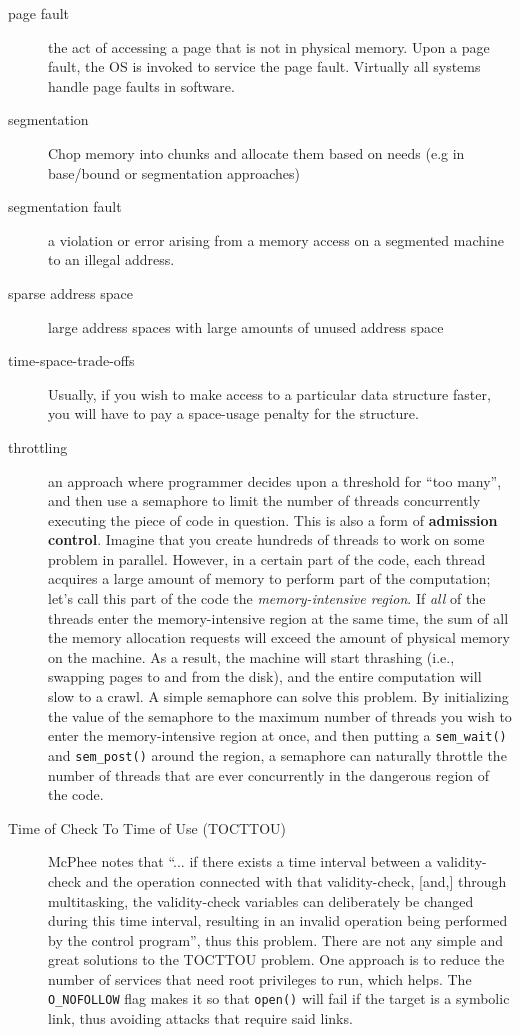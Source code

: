 \begin{description}
\item[page fault] the act of accessing a page that is not in physical memory.  Upon a page fault, the OS is invoked to service the page fault.  Virtually all systems handle page faults in software.

\item[segmentation] Chop memory into  chunks and allocate them based on needs (e.g in base/bound or segmentation approaches)

\item[segmentation fault] a violation or error arising from a memory access on a segmented machine to an illegal address.

\item[sparse address space] large address spaces with large amounts of unused address space

\item[time-space-trade-offs] Usually, if you wish to make access to a particular data structure faster, you will have to pay a space-usage penalty for the structure.

\item[throttling] an approach where programmer decides upon a threshold for ``too many'', and then use a semaphore to limit the number of threads concurrently executing the piece of code in question.  This is also a form of \textbf{admission control}. Imagine that you create hundreds of threads to work on some problem in parallel. However, in a certain part of the code, each thread acquires a large amount of memory to perform part of the computation; let’s call this part of the code the \emph{memory-intensive region}. If \emph{all} of the threads enter the memory-intensive region at the same time, the sum of all the memory allocation requests will exceed the amount of physical memory on the machine. As a result, the machine will start thrashing (i.e., swapping pages to and from the disk), and the entire computation will slow to a crawl.  A simple semaphore can solve this problem. By initializing the value of the semaphore to the maximum number of threads you wish to enter the memory-intensive region at once, and then putting a \texttt{sem\_wait()} and \texttt{sem\_post()} around the region, a semaphore can naturally throttle the number of threads that are ever concurrently in the dangerous region of the code.

\item[Time of Check To Time of Use (TOCTTOU)] McPhee notes that ``... if there exists a time interval between a validity-check and the operation connected with that validity-check, [and,] through multitasking, the validity-check variables can deliberately be changed during this time interval, resulting in an invalid operation being performed by the control program'', thus this problem.  There are not any simple and great solutions to the TOCTTOU problem. One approach is to reduce the number of services that need root privileges to run, which helps. The \texttt{O\_NOFOLLOW} flag makes it so that \texttt{open()} will fail if the target is a symbolic link, thus avoiding attacks that require said links.


\end{description}
